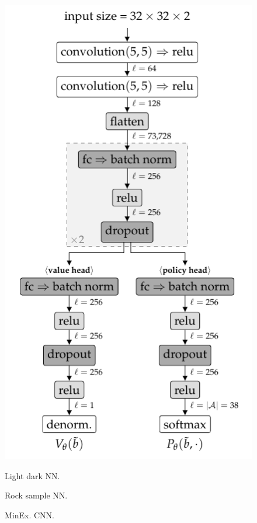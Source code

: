\begin{figure}[ht!]
\begin{minipage}{0.26\textwidth}
{            \includegraphics{diagrams/betazero/nn-minex.pdf}
        }
    \end{minipage}
    \hspace*{4mm}

    \begin{minipage}[t]{0.32\textwidth}
        \caption{Light dark NN.}
        \label{fig:nn_lightdark}
    \end{minipage}
    \hfill
    \begin{minipage}[t]{0.32\textwidth}
        \caption{Rock sample NN.}
        \label{fig:nn_rocksample}
    \end{minipage}
    \hfill
    \begin{minipage}[t]{0.32\textwidth}
        \caption{MinEx. CNN.}
        \label{fig:nn_minex}
    \end{minipage}
\end{figure}


